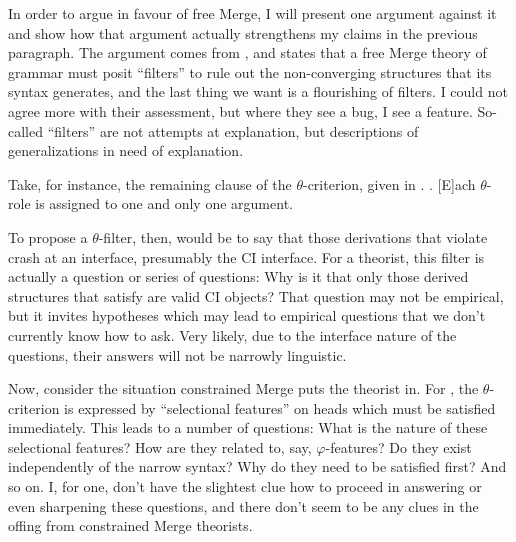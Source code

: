 \documentclass[MilwayThesis]{subfiles}
\begin{document}
In order to argue in favour of free Merge, I will present one argument against it and show how that argument actually strengthens my claims in the previous paragraph.
The argument comes from \textcite{frampton2008crash}, and states that a free Merge theory of grammar must posit ``filters'' to rule out the non-converging structures that its syntax generates, and the last thing we want is a flourishing of filters.
I could not agree more with their assessment, but where they see a bug, I see a feature.
So-called ``filters'' are not attempts at explanation, but descriptions of generalizations in need of explanation.

Take, for instance, the remaining clause of the $\theta$-criterion, given in \Next.
\ex. [E]ach $\theta$-role is assigned to one and only one argument. \parencite[36]{chomsky1981lectures}

To propose a $\theta$-filter, then, would be to say that those derivations that violate \Last crash at an interface, presumably the CI interface.
For a theorist, this filter is actually a question or series of questions: Why is it that only those derived structures that satisfy \Last are valid CI objects?
That question may not be empirical, but it invites hypotheses which may lead to empirical questions that we don't currently know how to ask.
Very likely, due to the interface nature of the questions, their answers will not be narrowly linguistic.

Now, consider the situation constrained Merge puts the theorist in.
For \textcite{frampton2008crash}, the $\theta$-criterion is expressed by ``selectional features'' on heads which must be satisfied immediately.
This leads to a number of questions: What is the nature of these selectional features?
How are they related to, say, $\varphi$-features?
Do they exist independently of the narrow syntax?
Why do they need to be satisfied first?
And so on.
I, for one, don't have the slightest clue how to proceed in answering or even sharpening these questions, and there don't seem to be any clues in the offing from constrained Merge theorists.
\end{document}
